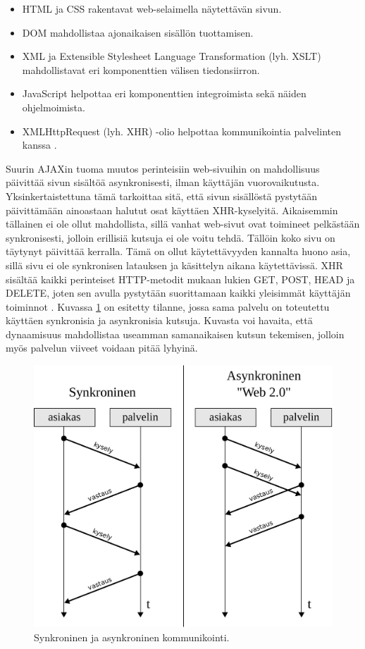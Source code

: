 \begin{itemize}
\item HTML ja CSS rakentavat web-selaimella näytettävän sivun.
\item DOM mahdollistaa ajonaikaisen sisällön tuottamisen.
\item XML ja Extensible Stylesheet Language Transformation (lyh. XSLT)
  mahdollistavat eri komponenttien välisen tiedonsiirron.
\item JavaScript helpottaa eri komponenttien integroimista sekä näiden
  ohjelmoimista.
\item XMLHttpRequest (lyh. XHR) -olio helpottaa kommunikointia
  palvelinten kanssa \cite{WEB2b}.
\end{itemize}

Suurin AJAXin tuoma muutos perinteisiin web-sivuihin on mahdollisuus päivittää sivun sisältöä asynkronisesti, ilman käyttäjän vuorovaikutusta. Yksinkertaistettuna tämä tarkoittaa sitä,
että sivun sisällöstä pystytään päivittämään ainoastaan halutut osat käyttäen XHR-kyselyitä. Aikaisemmin tällainen ei ole ollut mahdollista, sillä vanhat web-sivut ovat toimineet 
pelkästään synkronisesti, jolloin erillisiä kutsuja ei ole voitu tehdä. Tällöin koko sivu on täytynyt päivittää kerralla. Tämä on ollut käytettävyyden kannalta huono asia,
sillä sivu ei ole synkronisen latauksen ja käsittelyn aikana käytettävissä. XHR sisältää kaikki perinteiset HTTP-metodit mukaan lukien GET, POST, HEAD ja DELETE, joten sen avulla 
pystytään suorittamaan kaikki yleisimmät käyttäjän toiminnot \cite{WEB2}. Kuvassa \ref{synkroninen} on esitetty tilanne, jossa sama palvelu on toteutettu käyttäen synkronisia ja 
asynkronisia kutsuja. Kuvasta voi havaita, että dynaamisuus mahdollistaa useamman samanaikaisen kutsun tekemisen, jolloin myös palvelun viiveet voidaan pitää lyhyinä.

\begin{figure}[htp]
\centering
\includegraphics[width=11.5cm]{pics/synkroninen.pdf}
\caption{Synkroninen ja asynkroninen kommunikointi.}
\label{synkroninen}
\end{figure}

